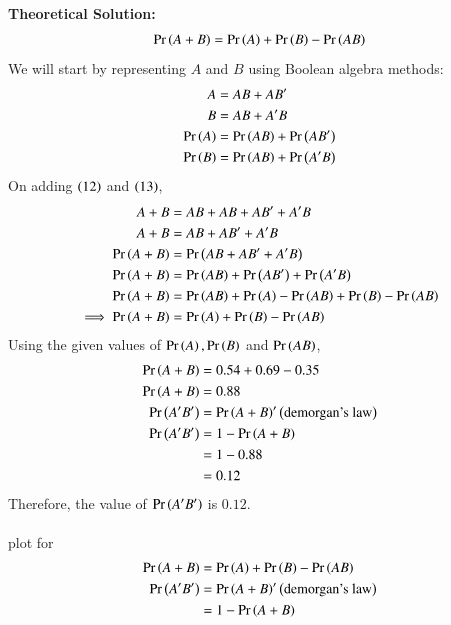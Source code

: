 \documentclass[journal]{IEEEtran}
\begin{document}
\textbf{Theoretical Solution:\\}
\begin{align}
	\Pr\left(A + B\right) = \Pr\left(A\right) + \Pr\left(B\right) - \Pr\left(AB\right)
\end{align}
We will start by representing $A$ and $B$ using Boolean algebra methods:
\begin{align}
	A &= AB + AB^\prime\\
	B &= AB + A^\prime B\\
	\Pr\left(A\right) &= \Pr\left(AB\right) + \Pr\left(AB^\prime\right)\\
	\Pr\left(B\right) &= \Pr\left(AB\right) + \Pr\left(A^\prime B\right)
\end{align}
On adding $\left(12\right)$ and $\left(13\right)$,
\begin{align}
	A + B &= AB + AB + AB^\prime + A^\prime B\\
	A + B &= AB + AB^\prime + A^\prime B\\
	\Pr\left(A + B\right) &= \Pr\left(AB + AB^\prime + A^\prime B\right)\\
	\Pr\left(A + B\right) &= \Pr\left(AB\right) + \Pr\left(AB^\prime\right) + \Pr\left(A^\prime B\right)\\
	\Pr\left(A + B\right) &= \Pr\left(AB\right) + \Pr\left(A\right) - \Pr\left(AB\right) + \Pr\left(B\right) - \Pr\left(AB\right)\\
	\implies \Pr\left(A + B\right) &= \Pr\left(A\right) + \Pr\left(B\right) - \Pr\left(AB\right)
\end{align}
Using the given values of $\Pr\left(A\right), \Pr\left(B\right)$ and $\Pr\left(AB\right)$,
\begin{align}
	\Pr\left(A + B\right) &= 0.54 + 0.69 - 0.35\\
	\Pr\left(A + B\right) &= 0.88\\
    \Pr\left(A^\prime B^\prime\right)&=\Pr\left(A+B\right)^\prime\left(\text{demorgan's law}\right)\\
    \Pr\left(A^\prime B^\prime\right)&=1-\Pr\left(A+B\right)\\
&=1-0.88\\
    &=0.12
\end{align}
Therefore, the value of $\Pr\left(A^\prime B^\prime\right)$ is $0.12$.\\\\


\pagebreak
plot for
\begin{align}
	\Pr\left(A + B\right) &= \Pr\left(A\right) + \Pr\left(B\right) - \Pr\left(AB\right)\\
    \Pr\left(A^\prime B^\prime\right)&=\Pr\left(A+B\right)^\prime\left(\text{demorgan's law}\right)\\
    &=1-\Pr\left(A+B\right)
\end{align}
\end{document}
